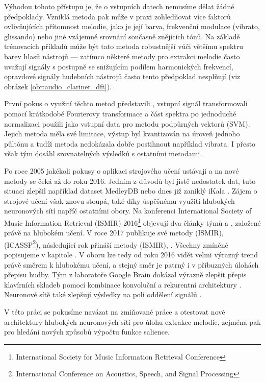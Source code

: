 Výhodou tohoto přístupu je, že o vstupních datech nemusíme dělat žádné předpoklady. Vzniklá metoda pak může v praxi zohledňovat více faktorů ovlivňujících přítomnost melodie, jako je její barva, frekvenční modulace (vibrato, glissando) nebo jiné vzájemné srovnání současně znějících tónů. Na základě trénovacích příkladů může být tato metoda robustnější vůči většímu spektru barev hlasů nástrojů --- zatímco některé metody pro extrakci melodie často uvažují signály s postupně se snižujícím podílem harmonických frekvencí, opravdové signály hudebních nástrojů často tento předpoklad nesplňují (viz obrázek \ref{obr:audio_clarinet_dft}).

První pokus o využití těchto metod představili \cite{Poliner}, vstupní signál transformovali pomocí krátkodobé Fourierovy transformace a část spektra po jednoduché normalizaci použili jako vstupní data pro metodu podpůrných vektorů (SVM). Jejich metoda měla své limitace, výstup byl kvantizován na úroveň jednoho půltónu a tudíž metoda nedokázala dobře postihnout například vibrata. I přesto však tým dosáhl srovnatelných výsledků s ostatními metodami. 

Po roce 2005 jakékoli pokusy o aplikaci strojového učení ustávají a na nové metody se čeká až do roku 2016. Jedním z důvodů byl jistě nedostatek dat, tuto situaci zlepšil například dataset MedleyDB \citep{Bittner2014} nebo dnes již zaniklý iKala \citep{Chan2015}. Zájem o strojové učení však znovu stoupá, také díky úspěšnému využití hlubokých neuronových sítí napříč ostatními obory. Na konferenci International Society of Music Information Retrieval (ISMIR) 2016\footnote{International Society for Music Information Retrieval Conference} objevují dva články týmů \cite{Kum2016} a \cite{Rigaud2016}, založené právě na hlubokém učení. V roce 2017 publikuje své metody \cite{Bittner2017} (ISMIR), \cite{Balke2017} (ICASSP\footnote{International Conference on Acoustics, Speech, and Signal Processing}), následující rok přináší metody \cite{DBasaranSEssid2018} (ISMIR), \cite{Bittner2018}. Všechny zmíněné popisujeme v kapitole . V oboru lze tedy od roku 2016 vidět velmi výrazný trend právě směrem k hlubokému učení, a stejný směr je patrný i v příbuzných úlohách přepisu hudby. Tým z laboratoře Google Brain dokázal výrazně zlepšit přepis klavírních skladeb pomocí kombinace konvoluční a rekurentní architektury \citep{Hawthorne2018}. Neuronové sítě také zlepšují výsledky na poli oddělení signálů \citep{Stoller2018}.

V této práci se pokusíme navázat na zmiňované práce a otestovat nové architektury hlubokých neuronových sítí pro úlohu extrakce melodie, zejména pak pro hledání nových způsobů výpočtu funkce salience. %

